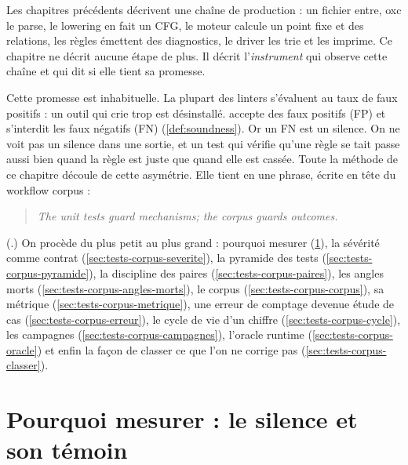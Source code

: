 
Les chapitres précédents décrivent une chaîne de production : un fichier  entre, oxc le parse, le lowering en fait un CFG, le moteur calcule un point fixe et des relations, les règles émettent des diagnostics, le driver les trie et les imprime. Ce chapitre ne décrit aucune étape de plus. Il décrit l'\emph{instrument} qui observe cette chaîne et qui dit si elle tient sa promesse.

Cette promesse est inhabituelle. La plupart des linters s'évaluent au taux de faux positifs : un outil qui crie trop est désinstallé. \reactant{} accepte des faux positifs (FP) et s'interdit les faux négatifs (FN) (\cref{def:soundness}). Or un FN est un silence. On ne \og voit\fg{} pas un silence dans une sortie, et un test qui vérifie qu'une règle se tait passe aussi bien quand la règle est juste que quand elle est cassée. Toute la méthode de ce chapitre découle de cette asymétrie. Elle tient en une phrase, écrite en tête du workflow corpus :

\begin{quote}\itshape
The unit tests guard mechanisms; the corpus guards outcomes.
\end{quote}
\noindent(.) On procède du plus petit au plus grand : pourquoi mesurer (\cref{sec:tests-corpus-pourquoi}), la sévérité comme contrat (\cref{sec:tests-corpus-severite}), la pyramide des tests (\cref{sec:tests-corpus-pyramide}), la discipline des paires (\cref{sec:tests-corpus-paires}), les angles morts (\cref{sec:tests-corpus-angles-morts}), le corpus (\cref{sec:tests-corpus-corpus}), sa métrique (\cref{sec:tests-corpus-metrique}), une erreur de comptage devenue étude de cas (\cref{sec:tests-corpus-erreur}), le cycle de vie d'un chiffre (\cref{sec:tests-corpus-cycle}), les campagnes (\cref{sec:tests-corpus-campagnes}), l'oracle runtime (\cref{sec:tests-corpus-oracle}) et enfin la façon de classer ce que l'on ne corrige pas (\cref{sec:tests-corpus-classer}).

\section{Pourquoi mesurer : le silence et son témoin}
\label{sec:tests-corpus-pourquoi}

